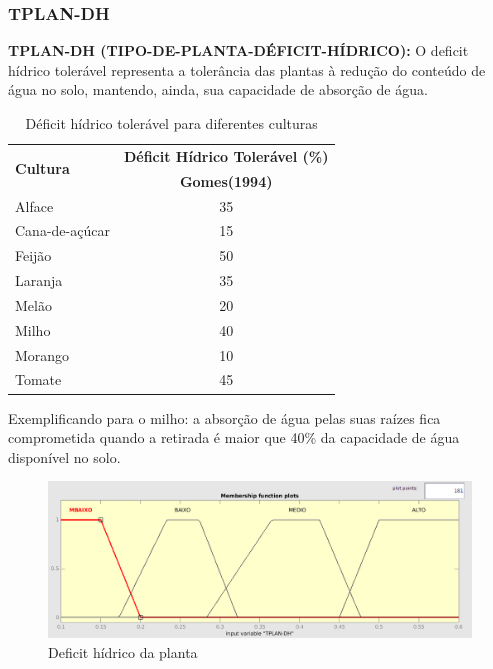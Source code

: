 \subsubsection{TPLAN-DH}

\textbf{TPLAN-DH (TIPO-DE-PLANTA-DÉFICIT-HÍDRICO):} O deficit hídrico tolerável representa a tolerância das plantas à redução do conteúdo de água no solo, mantendo, ainda, sua capacidade de absorção de água.

\begin{table}[h!]
	\centering
	\caption{Déficit hídrico tolerável para diferentes culturas}
	\label{tab:TPLAN-DH}
	\begin{tabular}{l c}
		\hline \hline
		\multirow{2}{*}{\textbf{Cultura}} & \textbf{Déficit Hídrico Tolerável (\%)} \\
		& \textbf{Gomes(1994)}                    \\
		\hline
		Alface                   & 35                             \\
		Cana-de-açúcar           & 15                             \\
		Feijão                   & 50                             \\
		Laranja                  & 35                             \\
		Melão                    & 20                             \\
		Milho                    & 40                             \\
		Morango                  & 10                             \\
		Tomate                   & 45                             \\
		\hline
	\end{tabular}
\end{table}

Exemplificando para o milho: a absorção de água pelas suas raízes fica comprometida
quando a retirada é maior que 40\% da capacidade de água disponível no solo.

\begin{figure}[h!]
\centering
\includegraphics[width=1\linewidth]{Descricao/Imagens/TPLAN-DH}
\caption{Deficit hídrico da planta}
\label{fig:TPLAN-DH}
\end{figure}

